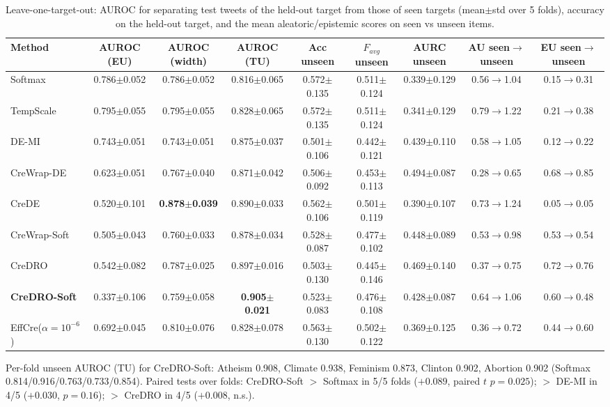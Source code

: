 \documentclass[11pt,a4paper]{article}
\newcommand{\best}[1]{\textbf{#1}}
\begin{document}
\begin{table}[h]
\centering\footnotesize\setlength{\tabcolsep}{3.5pt}
\begin{tabular}{l ccc cc c cc}
\toprule
Method & AUROC (EU) & AUROC (width) & AUROC (TU) & Acc unseen & $F_{avg}$ unseen & AURC unseen & AU seen$\to$unseen & EU seen$\to$unseen \\
\midrule
Softmax & 0.786$\pm$0.052 & 0.786$\pm$0.052 & 0.816$\pm$0.065 & 0.572$\pm$0.135 & 0.511$\pm$0.124 & 0.339$\pm$0.129 & 0.56$\to$1.04 & 0.15$\to$0.31 \\
TempScale & 0.795$\pm$0.055 & 0.795$\pm$0.055 & 0.828$\pm$0.065 & 0.572$\pm$0.135 & 0.511$\pm$0.124 & 0.341$\pm$0.129 & 0.79$\to$1.22 & 0.21$\to$0.38 \\
DE-MI & 0.743$\pm$0.051 & 0.743$\pm$0.051 & 0.875$\pm$0.037 & 0.501$\pm$0.106 & 0.442$\pm$0.121 & 0.439$\pm$0.110 & 0.58$\to$1.05 & 0.12$\to$0.22 \\
CreWrap-DE & 0.623$\pm$0.051 & 0.767$\pm$0.040 & 0.871$\pm$0.042 & 0.506$\pm$0.092 & 0.453$\pm$0.113 & 0.494$\pm$0.087 & 0.28$\to$0.65 & 0.68$\to$0.85 \\
CreDE & 0.520$\pm$0.101 & \best{0.878$\pm$0.039} & 0.890$\pm$0.033 & 0.562$\pm$0.106 & 0.501$\pm$0.119 & 0.390$\pm$0.107 & 0.73$\to$1.24 & 0.05$\to$0.05 \\
CreWrap-Soft & 0.505$\pm$0.043 & 0.760$\pm$0.033 & 0.878$\pm$0.034 & 0.528$\pm$0.087 & 0.477$\pm$0.102 & 0.448$\pm$0.089 & 0.53$\to$0.98 & 0.53$\to$0.54 \\
CreDRO & 0.542$\pm$0.082 & 0.787$\pm$0.025 & 0.897$\pm$0.016 & 0.503$\pm$0.130 & 0.445$\pm$0.146 & 0.469$\pm$0.140 & 0.37$\to$0.75 & 0.72$\to$0.76 \\
\textbf{CreDRO-Soft} & 0.337$\pm$0.106 & 0.759$\pm$0.058 & \best{0.905$\pm$0.021} & 0.523$\pm$0.083 & 0.476$\pm$0.108 & 0.428$\pm$0.087 & 0.64$\to$1.06 & 0.60$\to$0.48 \\
EffCre($\alpha{=}10^{-6}$) & 0.692$\pm$0.045 & 0.810$\pm$0.076 & 0.828$\pm$0.078 & 0.563$\pm$0.130 & 0.502$\pm$0.122 & 0.369$\pm$0.125 & 0.36$\to$0.72 & 0.44$\to$0.60 \\
\bottomrule
\end{tabular}
\caption{Leave-one-target-out: AUROC for separating test tweets of the held-out target from those of seen targets (mean$\pm$std over 5 folds), accuracy on the held-out target, and the mean aleatoric/epistemic scores on seen vs unseen items.}
\label{tab:e4a}
\end{table}

Per-fold unseen AUROC (TU) for CreDRO-Soft: Atheism 0.908, Climate 0.938, Feminism 0.873, Clinton 0.902, Abortion 0.902 (Softmax 0.814/0.916/0.763/0.733/0.854). Paired tests over folds: CreDRO-Soft $>$ Softmax in 5/5 folds ($+0.089$, paired $t$ $p=0.025$); $>$ DE-MI in 4/5 ($+0.030$, $p=0.16$); $>$ CreDRO in 4/5 ($+0.008$, n.s.).
\end{document}
